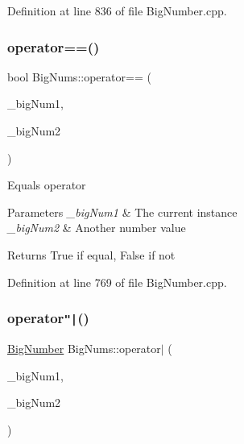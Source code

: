 Definition at line 836 of file Big\+Number.\+cpp.

\mbox{\label{namespace_big_nums_a850a2334f2158f7bbe71d1c6e9fad531}} 
\subsubsection{\texorpdfstring{operator==()}{operator==()}}
{\footnotesize\ttfamily bool Big\+Nums\+::operator== (\begin{DoxyParamCaption}\item[{const \mbox{\hyperlink{class_big_nums_1_1_big_number}{Big\+Number}} \&}]{\+\_\+big\+Num1,  }\item[{const \mbox{\hyperlink{class_big_nums_1_1_big_number}{Big\+Number}} \&}]{\+\_\+big\+Num2 }\end{DoxyParamCaption})}

Equals operator 
\begin{DoxyParams}{Parameters}
{\em \+\_\+big\+Num1} & The current instance \\
\hline
{\em \+\_\+big\+Num2} & Another number value \\
\hline
\end{DoxyParams}
\begin{DoxyReturn}{Returns}
True if equal, False if not 
\end{DoxyReturn}


Definition at line 769 of file Big\+Number.\+cpp.

\mbox{\label{namespace_big_nums_a3885538e918c8cb0cd96433da09462f0}} 
\subsubsection{\texorpdfstring{operator\texttt{"|}()}{operator|()}}
{\footnotesize\ttfamily \mbox{\hyperlink{class_big_nums_1_1_big_number}{Big\+Number}} Big\+Nums\+::operator$\vert$ (\begin{DoxyParamCaption}\item[{const \mbox{\hyperlink{class_big_nums_1_1_big_number}{Big\+Number}} \&}]{\+\_\+big\+Num1,  }\item[{const \mbox{\hyperlink{class_big_nums_1_1_big_number}{Big\+Number}} \&}]{\+\_\+big\+Num2 }\end{DoxyParamCaption})}

